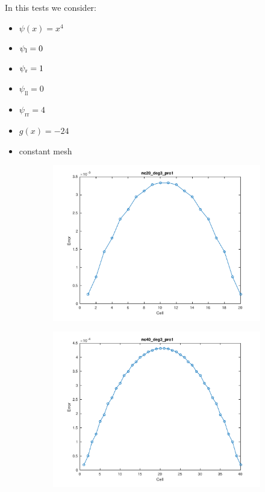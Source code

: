 \documentclass[11pt,a4paper]{article}
\theoremstyle{plain}
\theoremstyle{definition}
\begin{document}
\pagebreak
In this tests we consider:
\begin{itemize}
\item $\psi(x)=x^4$
\item $\psi_\text l=0$
\item $\psi_\text r=1$
\item $\psi_\text{ll}=0$
\item $\psi_\text{rr}=4$
\item $g(x)=-24$
\item constant mesh
\end{itemize}



\begin{figure}[H]
\begin{subfigure}[b]{0.48\textwidth}
\includegraphics[width=\linewidth]{../../tests_01_01/test_01_01_test9_pro1/output/plots/nc20_deg3_wei111_pro1.pdf}
\end{subfigure}\hspace*{\fill}
\begin{subfigure}[b]{0.48\textwidth}
\includegraphics[width=\linewidth]{../../tests_01_01/test_01_01_test9_pro1/output/plots/nc40_deg3_wei111_pro1.pdf}
\end{subfigure}


\end{figure}
\end{document}
